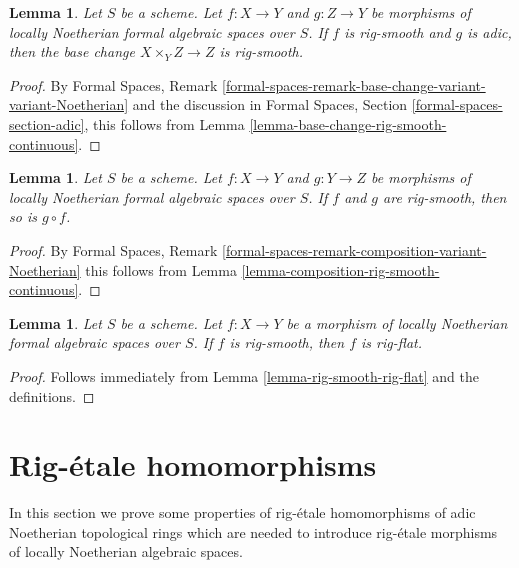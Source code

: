 \documentclass{stacks-project}
\theoremstyle{plain}
\newtheorem{lemma}[subsection]{Lemma}
\theoremstyle{definition}
\theoremstyle{remark}
\numberwithin{equation}{subsection}
\begin{document}
\begin{lemma}
\label{lemma-base-change-rig-smooth}
Let $S$ be a scheme. Let $f : X \to Y$ and $g : Z \to Y$
be morphisms of locally Noetherian formal algebraic spaces over $S$.
If $f$ is rig-smooth and $g$ is adic, then the base change
$X \times_Y Z \to Z$ is rig-smooth.
\end{lemma}

\begin{proof}
By Formal Spaces, Remark
\ref{formal-spaces-remark-base-change-variant-variant-Noetherian}
and the discussion in Formal Spaces, Section
\ref{formal-spaces-section-adic},
this follows from Lemma \ref{lemma-base-change-rig-smooth-continuous}.
\end{proof}

\begin{lemma}
\label{lemma-composition-rig-smooth}
Let $S$ be a scheme. Let $f : X \to Y$ and $g : Y \to Z$
be morphisms of locally Noetherian formal algebraic spaces over $S$.
If $f$ and $g$ are rig-smooth, then so is $g \circ f$.
\end{lemma}

\begin{proof}
By Formal Spaces, Remark
\ref{formal-spaces-remark-composition-variant-Noetherian}
this follows from Lemma \ref{lemma-composition-rig-smooth-continuous}.
\end{proof}

\begin{lemma}
\label{lemma-rig-smooth-rig-flat-morphism}
Let $S$ be a scheme. Let $f : X \to Y$ be a morphism of
locally Noetherian formal algebraic spaces over $S$.
If $f$ is rig-smooth, then $f$ is rig-flat.
\end{lemma}

\begin{proof}
Follows immediately from Lemma \ref{lemma-rig-smooth-rig-flat}
and the definitions.
\end{proof}









\section{Rig-\'etale homomorphisms}
\label{section-rig-etale-homomorphisms}

\noindent
In this section we prove some properties of rig-\'etale homomorphisms
of adic Noetherian topological rings which are needed to introduce
rig-\'etale morphisms of locally Noetherian algebraic spaces.
\end{document}
